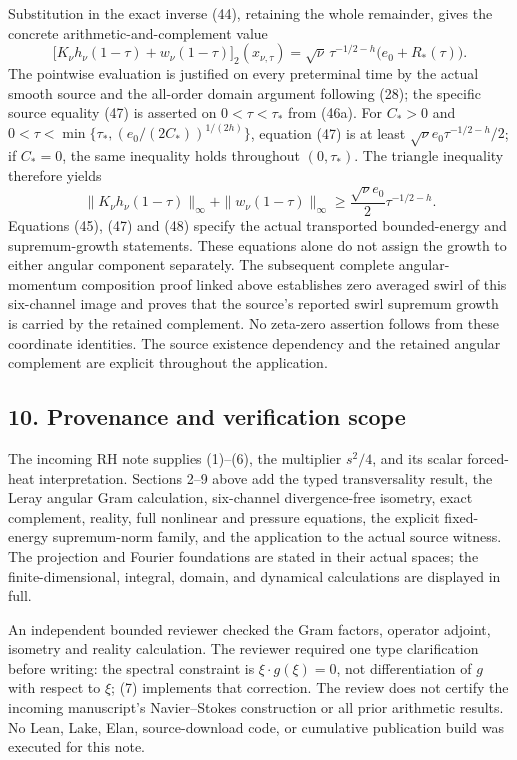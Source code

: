 Substitution in the exact inverse (44), retaining the whole remainder, gives the concrete arithmetic-and-complement value \[
\big[K_\nu h_\nu(1-\tau)+w_\nu(1-\tau)\big]_2(x_{\nu,\tau})
=\sqrt\nu\,\tau^{-1/2-h}\big(e_0+R_*(\tau)\big).
\tag{47}
\] The pointwise evaluation is justified on every preterminal time by the actual smooth source and the all-order domain argument following (28); the specific source equality (47) is asserted on \(0<\tau<\tau_*\) from (46a). For \(C_*>0\) and \(0<\tau<\min\{\tau_*,(e_0/(2C_*))^{1/(2h)}\}\), equation (47) is at least \(\sqrt\nu e_0\tau^{-1/2-h}/2\); if \(C_*=0\), the same inequality holds throughout \((0,\tau_*)\). The triangle inequality therefore yields \[
\|K_\nu h_\nu(1-\tau)\|_\infty+\|w_\nu(1-\tau)\|_\infty
\ge \frac{\sqrt\nu e_0}{2}\tau^{-1/2-h}.
\tag{48}
\] Equations (45), (47) and (48) specify the actual transported bounded-energy and supremum-growth statements. These equations alone do not assign the growth to either angular component separately. The subsequent complete angular-momentum composition proof linked above establishes zero averaged swirl of this six-channel image and proves that the source's reported swirl supremum growth is carried by the retained complement. No zeta-zero assertion follows from these coordinate identities. The source existence dependency and the retained angular complement are explicit throughout the application.

\subsection*{10. Provenance and verification scope}

The incoming RH note supplies (1)--(6), the multiplier \(s^2/4\), and its scalar forced-heat interpretation. Sections 2--9 above add the typed transversality result, the Leray angular Gram calculation, six-channel divergence-free isometry, exact complement, reality, full nonlinear and pressure equations, the explicit fixed-energy supremum-norm family, and the application to the actual source witness. The projection and Fourier foundations are stated in their actual spaces; the finite-dimensional, integral, domain, and dynamical calculations are displayed in full.

An independent bounded reviewer checked the Gram factors, operator adjoint, isometry and reality calculation. The reviewer required one type clarification before writing: the spectral constraint is \(\xi\cdot g(\xi)=0\), not differentiation of \(g\) with respect to \(\xi\); (7) implements that correction. The review does not certify the incoming manuscript's Navier--Stokes construction or all prior arithmetic results. No Lean, Lake, Elan, source-download code, or cumulative publication build was executed for this note.
